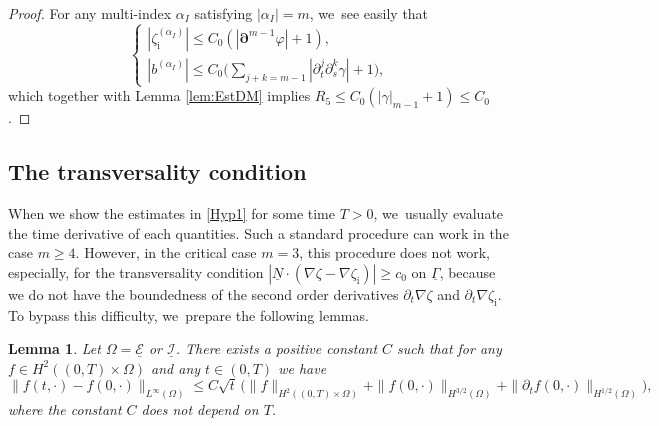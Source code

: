 \documentclass[11pt]{article}
\newcommand{\dt}{\partial_t}
\newcommand{\cI}{{\mathcal I}}
\newcommand{\cE}{{\mathcal E}}
\newcommand{\ul}[1]{\underline{#1}}
\newcommand{\itGamma}{\mathit{\Gamma}}
\newtheorem{lemma}[theorem]{Lemma}
\theoremstyle{definition}
\begin{document}
\begin{proof}
For any multi-index $\alpha_I$ satisfying $|\alpha_I|=m$, we~see easily that
\[
\begin{cases}
|\zeta_\mathrm{i}^{(\alpha_I)}| \leq C_0(|\bm{\partial}^{m-1}\varphi|+1), \\
|b^{(\alpha_I)}| \leq C_0 \bigl(\sum_{j+k=m-1}|\dt^j\partial_s^k\gamma| +1\bigr),
\end{cases}
\]
which together with Lemma \ref{lem:EstDM} implies $R_5 \leq C_0(|\gamma|_{m-1}+1)\leq C_0$.
\end{proof}

\subsection{The transversality condition}\label{secttransv}
When we show the estimates in \eqref{Hyp1} for some time $T>0$, we~usually evaluate the time derivative of each quantities.
Such a standard procedure can work in the case $m\geq4$.
However, in the critical case $m=3$, this procedure does not work, especially, for the transversality condition
\hbox{$|\ul{N}\cdot(\nabla\zeta-\nabla\zeta_\mathrm{i})| \geq c_0$} on $\ul{\itGamma}$,
because we do not have the boundedness of the second order derivatives $\dt\nabla\zeta$ and $\dt\nabla\zeta_\mathrm{i}$.
To bypass this difficulty, we~prepare the following lemmas.

\begin{lemma}\label{lem:Embedding1}
Let $\Omega=\ul{\cE}$ or $\ul{\cI}$.
There exists a positive constant $C$ such that for any $f\in H^2((0,T)\times\Omega)$
and any $t\in(0,T)$ we have
\[
\|f(t,\cdot)-f(0,\cdot)\|_{L^\infty(\Omega)}
\leq C\sqrt{t}\,\bigl(\|f\|_{H^2((0,T)\times\Omega)} + \|f(0,\cdot)\|_{H^{3/2}(\Omega)} + \|\dt f(0,\cdot)\|_{H^{1/2}(\Omega)} \bigr),
\]
where the constant $C$ does not depend on $T$.
\end{lemma}
\end{document}
